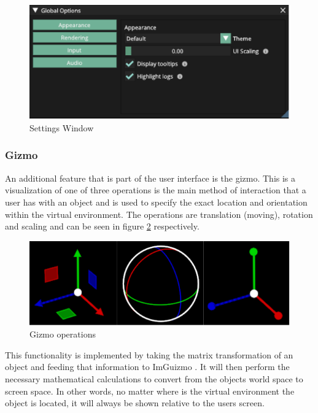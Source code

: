 \documentclass[11pt]{article}
\begin{document}
\begin{figure}[h!]
  \centering
  \includegraphics[width=\textwidth]{images/settings_window.png}
  \caption{Settings Window}
  \label{fig:settings_window}
\end{figure}

\subsubsection{Gizmo}
An additional feature that is part of the user interface is the gizmo. This is a
visualization of one of three operations is the main method of interaction that
a user has with an object and is used to specify the exact location and
orientation within the virtual environment. The operations are translation
(moving), rotation and scaling and can be seen in figure \ref{fig:gizmo}
respectively.
\begin{figure}[h!]
  \centering
  \includegraphics[width=\textwidth]{images/gizmo.png}
  \caption{Gizmo operations}
  \label{fig:gizmo}
\end{figure}

This functionality is implemented by taking the matrix transformation of an
object and feeding that information to ImGuizmo \cite{imguizmo}. It will then
perform the necessary mathematical calculations to convert from the objects
world space to screen space. In other words, no matter where is the virtual
environment the object is located, it will always be shown relative to the users
screen.
\end{document}
